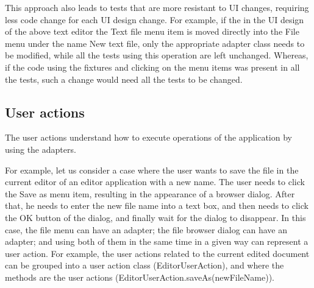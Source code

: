 This approach also leads to tests that are more resistant to UI changes, requiring less code change for each UI design change. For example, if the in the UI design of the above text editor the Text file menu item is moved directly into the File menu under the name New text file, only the appropriate adapter class needs to be modified, while all the tests using this operation are left unchanged. Whereas, if the code using the fixtures and clicking on the menu items was present in all the tests, such a change would need all the tests to be changed.

\subsection {User actions}

The user actions understand how to execute operations of the application by using the adapters. 

For example, let us consider a case where the user wants to save the file in the current editor of an editor application with a new name. The user needs to click the Save as menu item, resulting in the appearance of a browser dialog. After that, he needs to enter the new file name into a text box, and then needs to click the OK button of the dialog, and finally wait for the dialog to disappear. In this case, the file menu can have an adapter; the file browser dialog can have an adapter; and using both of them in the same time in a given way can represent a user action. For example, the user actions related to the current edited document can be grouped into a user action class (EditorUserAction), and where the methods are the user actions (EditorUserAction.saveAs(newFileName)).















